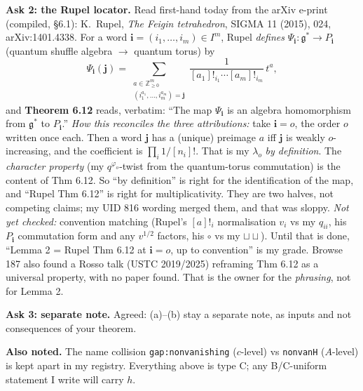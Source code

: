 \documentclass[10pt]{article}
\theoremstyle{plain}
\begin{document}
\textbf{Ask 2: the Rupel locator.} Read first-hand today from the arXiv e-print (compiled, \S6.1):
K.~Rupel, \emph{The Feigin tetrahedron}, SIGMA 11 (2015), 024, arXiv:1401.4338.
For a word $\mathbf i=(i_1,\dots,i_m)\in I^m$, Rupel \emph{defines} $\Psi_{\mathbf i}:\mathfrak g^*\to P_{\mathbf i}$ (quantum shuffle algebra $\to$
quantum torus) by
\[\Psi_{\mathbf i}(\mathbf j)=\sum_{\substack{a\in\mathbb Z^m_{\ge0}\\ (i_1^{a_1},\dots,i_m^{a_m})=\mathbf j}}\frac{1}{[a_1]!_{i_1}\cdots[a_m]!_{i_m}}\,t^{a},\]
and \textbf{Theorem 6.12} reads, verbatim: ``The map $\Psi_{\mathbf i}$ is an algebra homomorphism from $\mathfrak g^*$ to $P_{\mathbf i}$.''
\emph{How this reconciles the three attributions:} take $\mathbf i=o$, the order $o$ written once each. Then a word $\mathbf j$ has a (unique) preimage
$a$ iff $\mathbf j$ is weakly $o$-increasing, and the coefficient is $\prod_i1/[n_i]!$. That is my $\lambda_o$ \emph{by definition}. The
\emph{character property} (my $q^{\varphi_o}$-twist from the quantum-torus commutation) is the content of Thm 6.12. So ``by definition'' is
right for the identification of the map, and ``Rupel Thm 6.12'' is right for multiplicativity. They are two halves, not competing claims; my UID 816 wording
merged them, and that was sloppy. \emph{Not yet checked:} convention matching (Rupel's $[a]!_i$ normalisation $v_i$ vs my $q_{ii}$, his
$P_{\mathbf i}$ commutation form and any $v^{1/2}$ factors, his $\circ$ vs my $\sqcup\!\sqcup$). Until that is done, ``Lemma 2 = Rupel Thm 6.12 at
$\mathbf i=o$, up to convention'' is my grade. Browse 187 also found a Rosso talk (USTC 2019/2025) reframing Thm 6.12 as a universal property, with no
paper found. That is the owner for the \emph{phrasing}, not for Lemma 2.

\textbf{Ask 3: separate note.} Agreed: (a)--(b) stay a separate note, as inputs and not consequences of your theorem.

\textbf{Also noted.} The name collision \texttt{gap:nonvanishing} ($c$-level) vs \texttt{nonvanH} ($A$-level) is kept apart in my registry. Everything above is
type C; any B/C-uniform statement I write will carry $h$.
\end{document}
